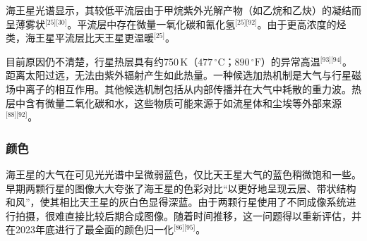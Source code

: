 海王星光谱显示，其较低平流层由于甲烷紫外光解产物（如乙烷和乙炔）的凝结而呈薄雾状\(^\text{[25][30]}\)。平流层中存在微量一氧化碳和氰化氢\(^\text{[25][92]}\)。由于更高浓度的烃类，海王星平流层比天王星更温暖\(^\text{[25]}\)。

目前原因仍不清楚，行星热层具有约750\,K（$477\,^\circ\text{C}$；$890\,^\circ\text{F}$）的异常高温\(^\text{[93][94]}\)。距离太阳过远，无法由紫外辐射产生如此热量。一种候选加热机制是大气与行星磁场中离子的相互作用。其他候选机制包括从内部传播并在大气中耗散的重力波。热层中含有微量二氧化碳和水，这些物质可能来源于如流星体和尘埃等外部来源\(^\text{[88][92]}\)。
\subsubsection{颜色}
海王星的大气在可见光光谱中呈微弱蓝色，仅比天王星大气的蓝色稍微饱和一些。早期两颗行星的图像大大夸张了海王星的色彩对比“以更好地呈现云层、带状结构和风”，使其相比天王星的灰白色显得深蓝。由于两颗行星使用了不同成像系统进行拍摄，很难直接比较后期合成图像。随着时间推移，这一问题得以重新评估，并在2023年底进行了最全面的颜色归一化\(^\text{[86][95]}\)。











